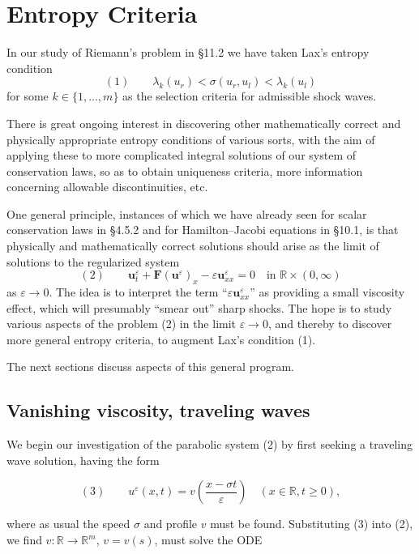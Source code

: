 \section{Entropy Criteria}\label{sec:entropy-criteria-systems}

In our study of Riemann's problem in \S11.2 we have taken Lax's entropy condition
$$(1) \qquad \lambda_k(u_r) < \sigma(u_r,u_l) < \lambda_k(u_l)$$
for some $k\in\{1,\ldots,m\}$ as the selection criteria for admissible shock waves.

There is great ongoing interest in discovering other mathematically correct and physically appropriate entropy conditions of various sorts, with the aim of applying these to more complicated integral solutions of our system of conservation laws, so as to obtain uniqueness criteria, more information concerning allowable discontinuities, etc.

One general principle, instances of which we have already seen for scalar conservation laws in \S4.5.2 and for Hamilton--Jacobi equations in \S10.1, is that physically and mathematically correct solutions should arise as the limit of solutions to the regularized system
$$(2) \qquad \mathbf{u}^\varepsilon_t + \mathbf{F}(\mathbf{u}^\varepsilon)_x - \varepsilon\mathbf{u}^\varepsilon_{xx} = 0 \quad \text{in } \mathbb{R}\times(0,\infty)$$
as $\varepsilon\to 0$. The idea is to interpret the term ``$\varepsilon\mathbf{u}^\varepsilon_{xx}$'' as providing a small viscosity effect, which will presumably ``smear out'' sharp shocks. The hope is to study various aspects of the problem (2) in the limit $\varepsilon\to 0$, and thereby to discover more general entropy criteria, to augment Lax's condition (1).

The next sections discuss aspects of this general program.

\subsection{Vanishing viscosity, traveling waves}\label{sec:vanishing-viscosity-traveling-waves}

We begin our investigation of the parabolic system (2) by first seeking a traveling wave solution, having the form

$$(3) \qquad u^\varepsilon(x,t) = v\left(\frac{x-\sigma t}{\varepsilon}\right) \quad (x\in\mathbb{R}, t\geq 0),$$

where as usual the speed $\sigma$ and profile $v$ must be found. Substituting (3) into (2), we find $v:\mathbb{R}\to\mathbb{R}^m$, $v=v(s)$, must solve the ODE

